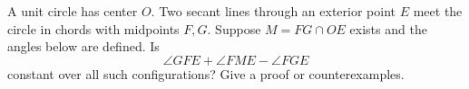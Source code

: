 A unit circle has center $O$. Two secant lines through an exterior point $E$ meet the circle in chords with midpoints $F,G$. Suppose $M=FG\cap OE$ exists and the angles below are defined. Is
\[
\angle GFE+\angle FME-\angle FGE
\]
constant over all such configurations? Give a proof or counterexamples.
